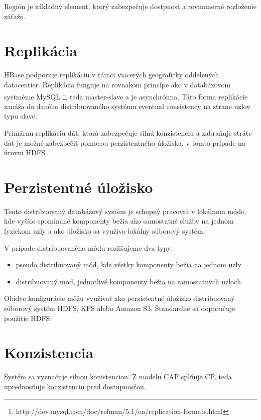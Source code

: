 \documentclass[11pt,twoside,a4paper]{book}
\begin{document}
Región je základný element, ktorý zabezpečuje dostpnosť a rovnomerné rozloženie záťaže.

\section{Replikácia}
HBase podporuje replikáciu v rámci viacerých geograficky oddelených datacentier. Replikácia funguje na rovnakom princípe ako v databázovom systméme MySQL \footnote{http://dev.mysql.com/doc/refman/5.1/en/replication-formats.html}, teda master-slave a je asynchrónna. Táto forma replikácie zanáša do daného distribuovaného systému eventual consistency na strane uzlov typu slave.


Primárnu replikáciu dát, ktorá zabezpečuje silnú konzistenciu a zabraňuje stráte dát je možné zabezpečiť pomocou perzistentného úložiska, v tomto prípade na úrovni HDFS.



\section{Perzistentné úložisko}

Tento distribuovaný databázový systém je schopný pracovať v lokálnom móde, kde vyššie spomínané komponenty bežia ako samostatné služby na jednom fyzickom uzly a ako úložisko sa využíva lokálny súborový systém.

V prípade distribuovaného módu rozlišujeme dva typy:
\begin{itemize}
 \item pseudo distribuovaný mód, kde všetky komponenty bežia na jednom uzly
 \item distribuovaný mód, jednotlivé komponenty bežia na samostatných uzloch
\end{itemize}

Obidve konfigurácie môžu využívať ako perzistentné úložisko distribuovaný súborový systém HDFS, KFS alebo Amazon S3. Štandardne sa doporučuje použitie HDFS.

\section{Konzistencia}

Systém sa vyznačuje silnou konistenciou. Z modelu CAP splňuje CP, teda uprednosňuje konzistenciu pred dostupnosťou.
\end{document}

